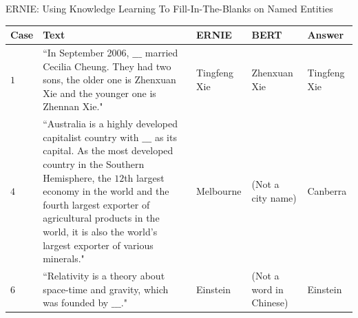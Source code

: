 \begin{frame}{ERNIE: Using Knowledge Learning To Fill-In-The-Blanks on Named Entities}


\begin{table}[htbp]
    \scriptsize 
    \centering \linespread{0.3}
    \setlength{\tabcolsep}{4pt} %
    \renewcommand{\arraystretch}{3} %
    
    \begin{tableFont}
    \begin{tabu} to \textwidth {| X[0.4] | X[6] | X | X | X |}
        
    
        \hline
      
        \centering \textbf{Case}
        & \centering \textbf{Text} 
        & \centering \textbf{ERNIE}
        & \centering\textbf{BERT} 
        & \centering \textbf{Answer} \\ 
        
        \hline
        
        
        $1$
        &
        ``In September 2006, $\_\_\_$ married Cecilia Cheung. They had two sons, the older one is Zhenxuan Xie and the younger one is Zhennan Xie." \newline
        & 
        Tingfeng Xie
        & 
        Zhenxuan Xie
        & 
        {\color{Green} Tingfeng Xie} \\ 
        
        \hline 
        
        
        
        $4$
        &
        ``Australia is a highly developed capitalist country with $\_\_\_$ as its capital. As the most developed country in the Southern Hemisphere, the $12$th largest economy in the world and the fourth largest exporter of agricultural products in the world, it is also the world's largest exporter of various minerals."   \newline 
        & 
        Melbourne
        & 
        (Not a city name)
        & 
        {\color{Green} Canberra} \\ 
        
        \hline 
        
        $6$
        &
        ``Relativity is a theory about space-time and gravity, which was founded by $\_\_\_$."   \newline 
        & 
        Einstein
        & 
        (Not a word in Chinese)
        & 
        {\color{Green} Einstein} \\ 
        

\end{tabu}
\end{tableFont}
\end{table}
\end{frame}
